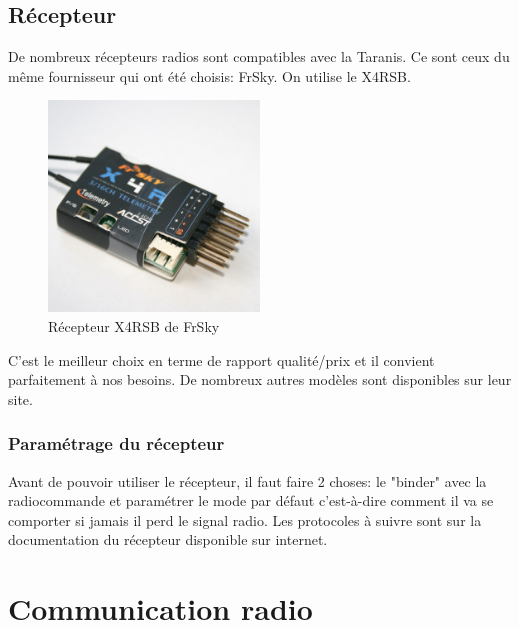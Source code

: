 \documentclass[a4paper, 11pt]{report}
\begin{document}
\subsection{Récepteur}
De nombreux récepteurs radios sont compatibles avec la Taranis. Ce sont ceux du même fournisseur qui ont été choisis: FrSky. On utilise le X4RSB.

\begin{figure}[h]
	\begin{center}
		\includegraphics[width=0.5\textwidth]{images/X4RSB.jpg}
		\caption{Récepteur X4RSB de FrSky}
	\end{center}
\end{figure}

C'est le meilleur choix en terme de rapport qualité/prix et il convient parfaitement à nos besoins. De nombreux autres modèles sont disponibles sur leur site.

\subsubsection{Paramétrage du récepteur}
Avant de pouvoir utiliser le récepteur, il faut faire 2 choses: le "binder" avec la radiocommande et paramétrer le mode par défaut c'est-à-dire comment il va se comporter si jamais il perd le signal radio. Les protocoles à suivre sont sur la documentation du récepteur disponible sur internet.

\section{Communication radio}
\end{document}
